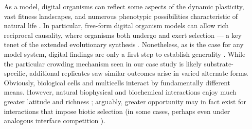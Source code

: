 
As a model, digital organisms can reflect some aspects of the dynamic plasticity, vast fitness landscapes, and numerous phenotypic possibilities characteristic of natural life \citep{pennock2007models,dolson2021digital}.
In particular, free-form digital organism models can allow rich reciprocal causality, where organisms both undergo and exert selection --- a key tenet of the extended evolutionary synthesis \citep{laland2015extended,laland2011cause,laland2012more}.
Nonetheless, as is the case for any model system, digital findings are only a first step to establish generality \citep{Wilke2001,Codoer2006}.
While the particular crowding mechanism seen in our case study is likely substrate-specific, additional replicates saw similar outcomes arise in varied alternate forms.
Obviously, biological cells and multicells interact by fundamentally different means.
However, natural biophysical and biochemical interactions enjoy much greater latitude and richness \citep{nadell2016spatial,houpt2026mutations};
arguably, greater opportunity may in fact exist for interactions that impose biotic selection (in some cases, perhaps even under analogous interface competition \citep{williams1991acrorhagi,padilla1984importance,fukasawa2026decoupling}).

